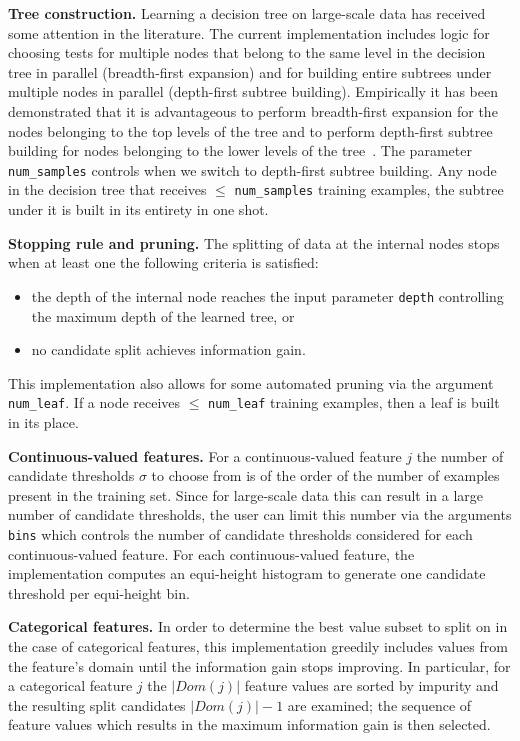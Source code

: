 \textbf{Tree construction.}
Learning a decision tree on large-scale data has received some
attention in the literature. The current implementation includes logic
for choosing tests for multiple nodes that belong to the same level in
the decision tree in parallel (breadth-first expansion) and for
building entire subtrees under multiple nodes in parallel (depth-first
subtree building). Empirically it has been demonstrated that it is
advantageous to perform breadth-first expansion for the nodes
belonging to the top levels of the tree and to perform depth-first
subtree building for nodes belonging to the lower levels of the tree~\cite{PandaHBB09:dtree}. The parameter {\tt num\_samples} controls when we
switch to  depth-first subtree building. Any node in the decision tree
that receives $\leq$ {\tt num\_samples} training examples, the subtree
under it is built in its entirety in one shot.


\textbf{Stopping rule and pruning.} 
The splitting of data at the internal nodes stops when at least one the following criteria is satisfied:
\begin{itemize}
	\item the depth of the internal node reaches the input parameter {\tt depth} controlling the maximum depth of the learned tree, or
	\item no candidate split achieves information gain.
\end{itemize}
This implementation also allows for some automated pruning via the argument {\tt num\_leaf}. If
a node receives $\leq$ {\tt num\_leaf} training examples, then a leaf
is built in its place.


\textbf{Continuous-valued features.}
For a continuous-valued feature
$j$ the number of candidate thresholds $\sigma$ to choose from is of
the order of the number of examples present in the training set. Since
for large-scale data this can result in a large number of candidate
thresholds, the user can limit this number via the arguments {\tt bins} which controls the number of candidate thresholds considered
for each continuous-valued feature. For each continuous-valued
feature, the implementation computes an equi-height histogram to
generate one candidate threshold per equi-height bin.


\textbf{Categorical features.}
In order to determine the best value subset to split on in the case of categorical features, this implementation greedily includes values from the feature's domain until the information gain stops improving.
In particular, for a categorical feature $j$ the $|Dom(j)|$ feature values are sorted by impurity and the resulting split candidates $|Dom(j)|-1$ are examined; the sequence of feature values which results in the maximum information gain is then selected.


